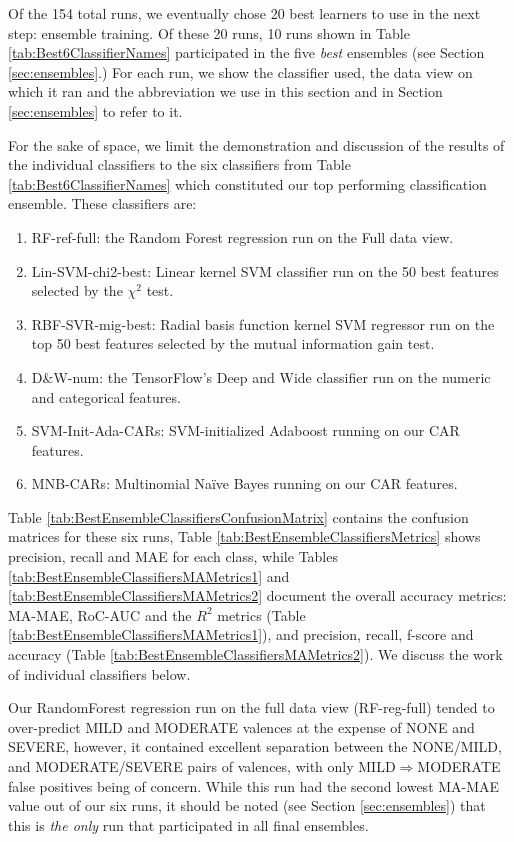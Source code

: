 Of the 154 total runs, we eventually chose 20 best learners
to use in the next step: ensemble training.  Of these 20 runs,
10 runs shown in Table \ref{tab:Best6ClassifierNames} participated
in the five \textit{best} ensembles (see Section \ref{sec:ensembles}.)
For each run, we show the classifier used, the data view on which it
ran and the abbreviation we use in this section
and in Section \ref{sec:ensembles} to refer to it.  

For the sake of space, we limit the demonstration and discussion
of the results of the individual classifiers to the six
classifiers from Table \ref{tab:Best6ClassifierNames} which
constituted our top performing classification ensemble.
These classifiers are:
\begin{enumerate}
\item \textsf{RF-ref-full}: the Random Forest regression run on the \textsf{Full}
data view.
\item \textsf{Lin-SVM-chi2-best}: Linear kernel SVM classifier run
on the 50 best features selected by the  $\chi^2$ test.
\item \textsf{RBF-SVR-mig-best}: Radial basis function kernel SVM regressor run on
the top 50 best features selected by the mutual information gain test.
\item \textsf{D\&W-num}: the TensorFlow's Deep and Wide classifier run on
the numeric and categorical features.
\item \textsf{SVM-Init-Ada-CARs}: SVM-initialized Adaboost running on our CAR features.
\item \textsf{MNB-CARs}: Multinomial Na\"{i}ve Bayes running on our CAR features.

\end{enumerate}

Table \ref{tab:BestEnsembleClassifiersConfusionMatrix} contains the
confusion matrices for these six runs, Table \ref{tab:BestEnsembleClassifiersMetrics}
shows precision, recall and \textsf{MAE} for each class, while Tables \ref{tab:BestEnsembleClassifiersMAMetrics1} and \ref{tab:BestEnsembleClassifiersMAMetrics2}
document the overall accuracy metrics: \textsf{MA-MAE}, \textsf{RoC-AUC}  and
the \textsf{$R^2$} metrics (Table \ref{tab:BestEnsembleClassifiersMAMetrics1}),
and precision, recall, f-score and accuracy (Table \ref{tab:BestEnsembleClassifiersMAMetrics2}).  We discuss the work of individual classifiers
below.

Our \textsf{RandomForest} regression run on the full data view (\textsf{RF-reg-full})
tended to over-predict \textsf{MILD} and \textsf{MODERATE} valences at the expense of
\textsf{NONE} and \textsf{SEVERE}, however, it contained excellent separation 
between the \textsf{NONE}/\textsf{MILD}, and \textsf{MODERATE}/\textsf{SEVERE} pairs
of valences, with only \textsf{MILD}$\Rightarrow$\textsf{MODERATE} false positives
being of concern.  While this run had the second lowest \textsf{MA-MAE} value out of our
six runs, it should be noted (see Section \ref{sec:ensembles}) that this is \textit{the only}
run that participated in all final ensembles. 

